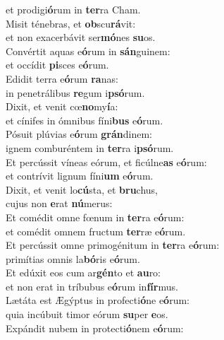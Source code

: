 \evenverse et prodigi\textbf{ó}rum in \textbf{ter}ra Cham.\\
\oddverse Misit ténebras, et \textbf{ob}scu\textbf{rá}vit:~\*\\
\oddverse et non exacerbávit ser\textbf{mó}nes \textbf{su}os.\\
\evenverse Convértit aquas e\textbf{ó}rum in \textbf{sán}guinem:~\*\\
\evenverse et occídit \textbf{pi}sces e\textbf{ó}rum.\\
\oddverse Edidit terra e\textbf{ó}rum \textbf{ra}nas:~\*\\
\oddverse in penetrálibus \textbf{re}gum i\textbf{psó}rum.\\
\evenverse Dixit, et venit cœ\textbf{no}my\textbf{í}a:~\*\\
\evenverse et cínifes in ómnibus fíni\textbf{bus} e\textbf{ó}rum.\\
\oddverse Pósuit plúvias e\textbf{ó}rum \textbf{grán}dinem:~\*\\
\oddverse ignem comburéntem in \textbf{ter}ra i\textbf{psó}rum.\\
\evenverse Et percússit víneas eórum, et ficúlne\textbf{as} e\textbf{ó}rum:~\*\\
\evenverse et contrívit lignum fíni\textbf{um} e\textbf{ó}rum.\\
\oddverse Dixit, et venit lo\textbf{cú}sta, et \textbf{bru}chus,~\*\\
\oddverse cujus non \textbf{e}rat \textbf{nú}merus:\\
\evenverse Et comédit omne fœnum in \textbf{ter}ra e\textbf{ó}rum:~\*\\
\evenverse et comédit omnem fructum \textbf{ter}ræ e\textbf{ó}rum.\\
\oddverse Et percússit omne primogénitum in \textbf{ter}ra e\textbf{ó}rum:~\*\\
\oddverse primítias omnis la\textbf{bó}ris e\textbf{ó}rum.\\
\evenverse Et edúxit eos cum ar\textbf{gén}to et \textbf{au}ro:~\*\\
\evenverse et non erat in tríbubus e\textbf{ó}rum in\textbf{fír}mus.\\
\oddverse Lætáta est Ægýptus in profecti\textbf{ó}ne e\textbf{ó}rum:~\*\\
\oddverse quia incúbuit timor eórum \textbf{su}per \textbf{e}os.\\
\evenverse Expándit nubem in protecti\textbf{ó}nem e\textbf{ó}rum:~\*\\
